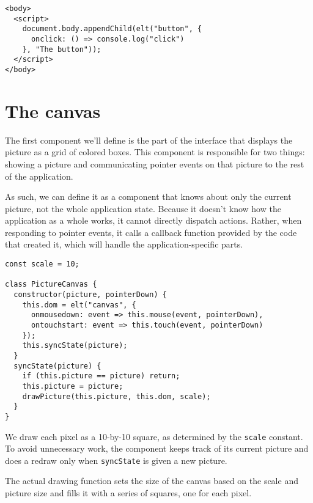 \begin{lstlisting}
<body>
  <script>
    document.body.appendChild(elt("button", {
      onclick: () => console.log("click")
    }, "The button"));
  </script>
</body>
\end{lstlisting}
\noindent

\section{The canvas}

The first component we'll define is the part of the interface that displays the picture as a grid of colored boxes. This component is responsible for two things: showing a picture and communicating pointer events on that picture to the rest of the application.

As such, we can define it as a component that knows about only the current picture, not the whole application state. Because it doesn't know how the application as a whole works, it cannot directly dispatch actions. Rather, when responding to pointer events, it calls a callback function provided by the code that created it, which will handle the application-specific parts.

\begin{lstlisting}
const scale = 10;

class PictureCanvas {
  constructor(picture, pointerDown) {
    this.dom = elt("canvas", {
      onmousedown: event => this.mouse(event, pointerDown),
      ontouchstart: event => this.touch(event, pointerDown)
    });
    this.syncState(picture);
  }
  syncState(picture) {
    if (this.picture == picture) return;
    this.picture = picture;
    drawPicture(this.picture, this.dom, scale);
  }
}
\end{lstlisting}
\noindent{}

We draw each pixel as a 10-by-10 square, as determined by the \lstinline`scale` constant. To avoid unnecessary work, the component keeps track of its current picture and does a redraw only when \lstinline`syncState` is given a new picture.

The actual drawing function sets the size of the canvas based on the scale and picture size and fills it with a series of squares, one for each pixel.

